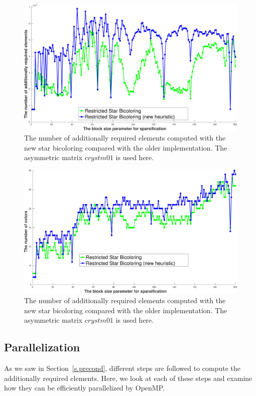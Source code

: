 \documentclass[12pt, twoside,a4paper,toc=bibliography]{scrbook}
\newcommand{\secref}[1]{Section~\protect\ref{#1}}
\begin{document}
\begin{figure}
\includegraphics[width=\linewidth]{bls_adds_crystm01_old_star_vs_new}
\caption{The number of additionally required elements computed with
the new star bicoloring compared with the older implementation.
The asymmetric matrix \textit{$crystm01$} is used here.}
\label{bls_adds_crystm01_old_star_vs_new}
\end{figure}

\begin{figure}
\includegraphics[width=\linewidth]{bls_cols_crystm01_old_star_vs_new}
\caption{The number of additionally required elements computed with
the new star bicoloring compared with the older implementation.
The asymmetric matrix \textit{$crystm01$} is used here.}
\label{bls_cols_crystm01_old_star_vs_new}
\end{figure}
\subsection{Parallelization}
\label{s.parallel}
As we saw in \secref{s.precond}, different steps are followed
to compute the additionally required elements. Here, we look at each of
these steps and examine how they can be efficiently parallelized by OpenMP.
\end{document}
